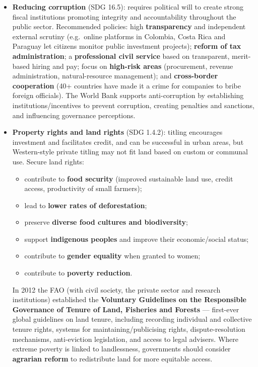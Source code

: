 \documentclass[a4paper,12pt]{article}
\begin{document}
\begin{itemize}
  \item \textbf{Reducing corruption} (SDG 16.5): requires political will to create strong fiscal institutions promoting integrity and accountability throughout the public sector. Recommended policies: high \textbf{transparency} and independent external scrutiny (e.g.\ online platforms in Colombia, Costa Rica and Paraguay let citizens monitor public investment projects); \textbf{reform of tax administration}; a \textbf{professional civil service} based on transparent, merit-based hiring and pay; focus on \textbf{high-risk areas} (procurement, revenue administration, natural-resource management); and \textbf{cross-border cooperation} (40+ countries have made it a crime for companies to bribe foreign officials). The World Bank supports anti-corruption by establishing institutions/incentives to prevent corruption, creating penalties and sanctions, and influencing governance perceptions.
  \item \textbf{Property rights and land rights} (SDG 1.4.2): titling encourages investment and facilitates credit, and can be successful in urban areas, but Western-style private titling may not fit land based on custom or communal use. Secure land rights:
  \begin{itemize}
    \item contribute to \textbf{food security} (improved sustainable land use, credit access, productivity of small farmers);
    \item lead to \textbf{lower rates of deforestation};
    \item preserve \textbf{diverse food cultures and biodiversity};
    \item support \textbf{indigenous peoples} and improve their economic/social status;
    \item contribute to \textbf{gender equality} when granted to women;
    \item contribute to \textbf{poverty reduction}.
  \end{itemize}
  In 2012 the FAO (with civil society, the private sector and research institutions) established the \textbf{Voluntary Guidelines on the Responsible Governance of Tenure of Land, Fisheries and Forests} --- first-ever global guidelines on land tenure, including recording individual and collective tenure rights, systems for maintaining/publicising rights, dispute-resolution mechanisms, anti-eviction legislation, and access to legal advisers. Where extreme poverty is linked to landlessness, governments should consider \textbf{agrarian reform} to redistribute land for more equitable access.
\end{itemize}
\end{document}
